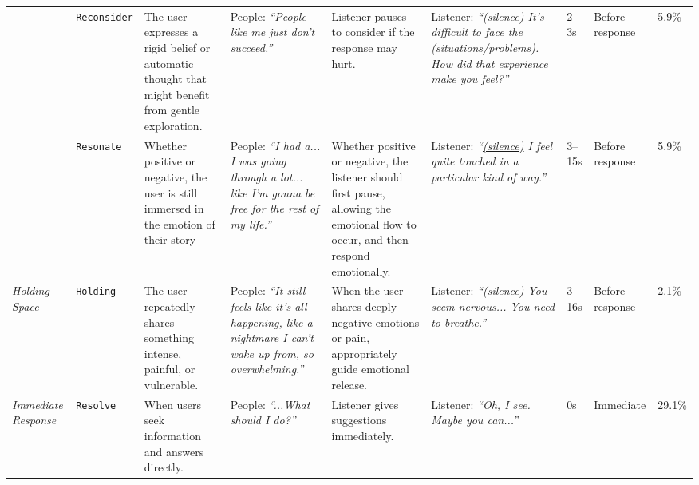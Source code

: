 \begin{table}[t]
{\begin{tabular}{p{1.1cm} p{1.3cm} p{4.5cm} p{3.5cm} p{3.5cm} p{4.2cm} p{1.3cm} p{2cm} p{1.3cm}}
& \texttt{Reconsider} 
& The user expresses a rigid belief or automatic thought that might benefit from gentle exploration. 
& People: \textit{``People like me just don't succeed.''}
& Listener pauses to consider if the response may hurt. 
& Listener: \textit{``\underline{(silence)} It's difficult to face the (situations/problems). How did that experience make you feel?''}
& 2–3s 
& Before response
& 5.9\%\\

& \texttt{Resonate} 
& Whether positive or negative, the user is still immersed in the emotion of their story 
& People: \textit{``I had a... I was going through a lot... like I'm gonna be free for the rest of my life.''}
& Whether positive or negative, the listener should first pause, allowing the emotional flow to occur, and then respond emotionally.
& Listener: \textit{``\underline{(silence)} I feel quite touched in a particular kind of way.''}
& 3–15s 
& Before response
& 5.9\%\\
\midrule

\emph{Holding Space}
& \texttt{Holding}  
& The user repeatedly shares something intense, painful, or vulnerable. 
& People: \textit{``It still feels like it's all happening, like a nightmare I can't wake up from, so overwhelming.''}
& When the user shares deeply negative emotions or pain, appropriately guide emotional release.
& Listener: \textit{``\underline{(silence)} You seem nervous... You need to breathe.''}
& 3–16s 
& Before response
& 2.1\%\\
\midrule

\emph{Immediate Response}
& \texttt{Resolve} 
& When users seek information and answers directly.
& People: \textit{``...What should I do?''}
& Listener gives suggestions immediately.
& Listener: \textit{``Oh, I see. Maybe you can...''}
& 0s
& Immediate
& 29.1\%\\
\bottomrule
\end{tabular}}
\end{table}


